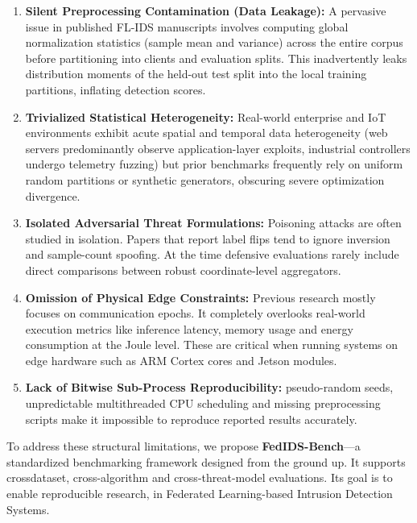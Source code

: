 \documentclass[runningheads]{llncs}
\begin{document}
\begin{enumerate}
    \item \textbf{Silent Preprocessing Contamination (Data Leakage):} A pervasive issue in published FL-IDS manuscripts involves computing global normalization statistics (sample mean and variance) across the entire corpus before partitioning into clients and evaluation splits. This inadvertently leaks distribution moments of the held-out test split into the local training partitions, inflating detection scores.
    \item \textbf{Trivialized Statistical Heterogeneity:} Real-world enterprise and IoT environments exhibit acute spatial and temporal data heterogeneity (web servers predominantly observe application-layer exploits, industrial controllers undergo telemetry fuzzing) but prior benchmarks frequently rely on uniform random partitions or synthetic generators, obscuring severe optimization divergence.
    \item \textbf{Isolated Adversarial Threat Formulations:} Poisoning attacks are often studied in isolation. Papers that report label flips tend to ignore inversion and sample-count spoofing. At the time defensive evaluations rarely include direct comparisons between robust coordinate-level aggregators.
    \item \textbf{Omission of Physical Edge Constraints:} Previous research mostly focuses on communication epochs. It completely overlooks real-world execution metrics like inference latency, memory usage and energy consumption at the Joule level. These are critical when running systems on edge hardware such as ARM Cortex cores and Jetson modules.
    \item \textbf{Lack of Bitwise Sub-Process Reproducibility:} pseudo-random seeds, unpredictable multithreaded CPU scheduling and missing preprocessing scripts make it impossible to reproduce reported results accurately.
\end{enumerate}

To address these structural limitations, we propose \textbf{FedIDS-Bench}---a standardized benchmarking framework designed from the ground up. It supports crossdataset, cross-algorithm and cross-threat-model evaluations. Its goal is to enable reproducible research, in Federated Learning-based Intrusion Detection Systems.
\end{document}

